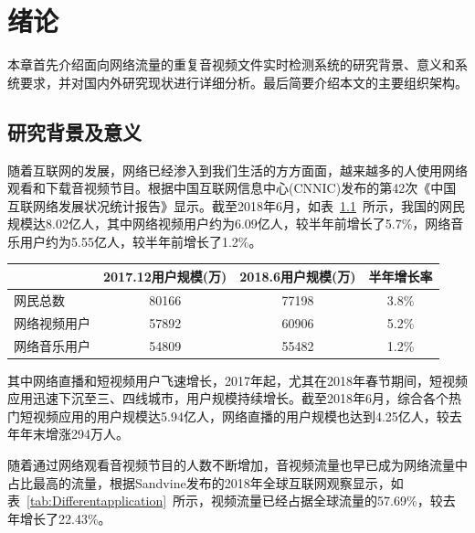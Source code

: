\chapter{绪论}\label{chap:introduction}

本章首先介绍面向网络流量的重复音视频文件实时检测系统的研究背景、意义和系统要求，并对国内外研究现状进行详细分析。最后简要介绍本文的主要组织架构。

\section{研究背景及意义}

随着互联网的发展，网络已经渗入到我们生活的方方面面，越来越多的人使用网络观看和下载音视频节目。根据中国互联网信息中心(CNNIC)发布的第42次《中国互联网络发展状况统计报告》\cite{CNNIC2018}显示。截至2018年6月，如表~\ref{tab:Numberofuser}~所示，我国的网民规模达8.02亿人，其中网络视频用户约为6.09亿人，较半年前增长了5.7\%，网络音乐用户约为5.55亿人，较半年前增长了1.2\%。

\begin{table}[!htbp]
    \label{tab:Numberofuser}
    \centering
    \footnotesize%
    \setlength{\tabcolsep}{4pt}%
    \renewcommand{\arraystretch}{1.2}%
    \begin{tabular}{lccc}
        \hline
        &2017.12用户规模(万)&2018.6用户规模(万)&半年增长率\\
        \hline
        网民总数&80166&77198&3.8\%\\
        网络视频用户&57892&60906&5.2\%\\
        网络音乐用户&54809&55482&1.2\%\\
        \hline
    \end{tabular}
\end{table}

其中网络直播和短视频用户飞速增长，2017年起，尤其在2018年春节期间，短视频应用迅速下沉至三、四线城市，用户规模持续增长。截至2018年6月，综合各个热门短视频应用的用户规模达5.94亿人，网络直播的用户规模也达到4.25亿人，较去年年末增涨294万人。

随着通过网络观看音视频节目的人数不断增加，音视频流量也早已成为网络流量中占比最高的流量，根据Sandvine发布的2018年全球互联网观察\cite{PhenomenaReport}显示，如表~\ref{tab:Differentapplication}~所示，视频流量已经占据全球流量的57.69\%，较去年增长了22.43\%。

